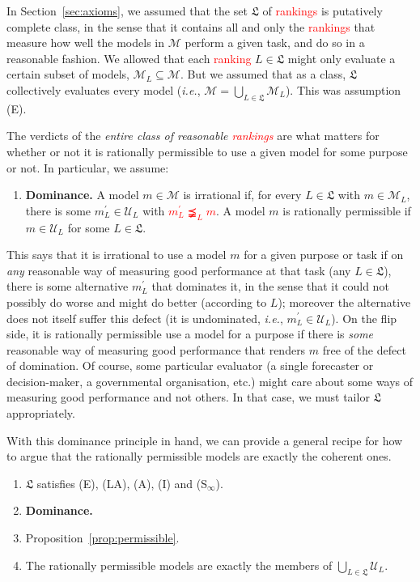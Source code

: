 \documentclass[11pt]{article}
\theoremstyle{definition}
\theoremstyle{remark}
\newcommand{\M}{\mathcal M}
\newcommand{\U}{\mathcal U}
\begin{document}
In Section~\ref{sec:axioms}, we assumed that the set $\mathfrak L$ of \textcolor{red}{rankings} is putatively complete class, in the sense that it contains all and only the \textcolor{red}{rankings} that measure how well the models in $\M$ perform a given task, and do so in a reasonable fashion. We allowed that each \textcolor{red}{ranking} $L\in\mathfrak L$ might only evaluate a certain subset of models, $\M_L\subseteq\M$. But we assumed that as a class, $\mathfrak L$ collectively evaluates every model (\textit{i.e.}, $\M=\bigcup_{L\in\mathfrak L}\M_L$). This was assumption (E).




The verdicts of the \textit{entire class of reasonable \textcolor{red}{rankings}} are what matters for whether or not it is rationally permissible to use a given model for some purpose or not. In particular, we assume:


\begin{enumerate}[label=\textbf{(D)},leftmargin=*]
\item \textbf{Dominance.} A model $m\in\M$ is irrational if, for every $L\in\mathfrak L$ with $m\in\M_L$, there is some $m_L^\prime\in\U_L$ with \textcolor{red}{$m_L^\prime\precneqq_L m$}. A model $m$ is rationally permissible if $m\in\U_L$ for some $L\in\mathfrak L$.
\end{enumerate}


This says that it is irrational to use a model $m$ for a given purpose or task if on \textit{any} reasonable way of measuring good performance at that task (any $L\in\mathfrak L$), there is some alternative $m_L^\prime$ that dominates it, in the sense that it could not possibly do worse and might do better (according to $L$); moreover the alternative does not itself suffer this defect (it is undominated, \textit{i.e.}, $m_L^\prime\in\U_L$). On the flip side, it is rationally permissible use a model for a purpose if there is \textit{some} reasonable way of measuring good performance that renders $m$ free of the defect of domination. Of course, some particular evaluator (a single forecaster or decision-maker, a governmental organisation, etc.) might care about some ways of measuring good performance and not others. In that case, we must tailor $\mathfrak L$ appropriately.


With this dominance principle in hand, we can provide a general recipe for how to argue that the rationally permissible models are exactly the coherent ones. 

\begin{enumerate}[label=\textbf{(P\arabic*)},leftmargin=*]
\item $\mathfrak L$ satisfies (E), (LA), (A), (I) and (S$_\infty$).
\item \textbf{Dominance.}
\item Proposition~\ref{prop:permissible}.
\item[\textbf{(C)}] The rationally permissible models are exactly the members of $\bigcup_{L\in\mathfrak L}\U_L$. 

\end{enumerate}
\end{document}
